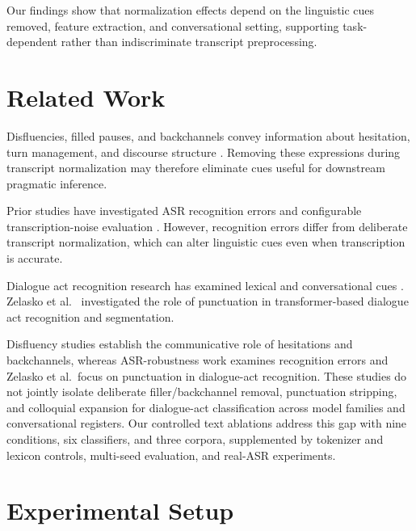 \documentclass[conference]{IEEEtran}
\begin{document}
Our findings show that normalization effects depend
on the linguistic cues removed, feature extraction,
and conversational setting, supporting task-dependent
rather than indiscriminate transcript preprocessing.

\section{Related Work}

Disfluencies, filled pauses, and backchannels
convey information about hesitation, turn management,
and discourse structure
\cite{CLARK200273,
https://doi.org/10.1111/j.1749-818X.2008.00068.x,
shriberg1999phoneticCO,
GinzburgFernandezSchlangen2014,
CLARK1989259}. Removing these expressions during
transcript normalization may therefore eliminate
cues useful for downstream pragmatic inference.

Prior studies have investigated ASR recognition errors
and configurable transcription-noise evaluation
\cite{Cui2021AnAT,Nechaev2021,LI2024104598,
kubis-etal-2023-back,shapira-etal-2025-measuring,
zusag24_interspeech}.
However, recognition errors differ from deliberate
transcript normalization, which can alter linguistic
cues even when transcription is accurate.

Dialogue act recognition research has examined
lexical and conversational cues
\cite{jurafsky-shriberg-biasca1997,
Core1997CodingDW,stolcke-etal-2000-dialogue}.
Zelasko et al.\ \cite{zelasko-etal-2021-helps}
investigated the role of punctuation in
transformer-based dialogue act recognition and
segmentation.

Disfluency studies establish the communicative role
of hesitations and backchannels, whereas ASR-robustness
work examines recognition errors and Zelasko et al.\
focus on punctuation in dialogue-act recognition.
These studies do not jointly isolate deliberate
filler/backchannel removal, punctuation stripping,
and colloquial expansion for dialogue-act classification
across model families and conversational registers.
Our controlled text ablations address this gap with
nine conditions, six classifiers, and three corpora,
supplemented by tokenizer and lexicon controls,
multi-seed evaluation, and real-ASR experiments.



\section{Experimental Setup}
\end{document}
